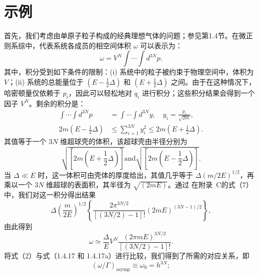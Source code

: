 \section{示例}\label{ux793aux4f8b_chap2}
首先，我们考虑由单原子粒子构成的经典理想气体的问题；参见第1.4节。在微正则系综中，代表系统各成员的相空间体积 \(\omega\) 可以表示为：
\begin{equation}\tag{2.3.9}\label{eq:2.3.9}
\omega = V^{N}\int\cdots\int d^{3N}p .
\end{equation}
其中，积分受到如下条件的限制：(i) 系统中的粒子被约束于物理空间中，体积为 \(V\)；(ii) 系统的总能量位于 \((E-\frac{1}{2}\Delta)\) 和 \((E+\frac{1}{2}\Delta)\) 之间。由于在这种情况下，哈密顿量仅依赖于 \(p_i\)，因此可以轻松地对 \(q_i\) 进行积分；这些积分结果会得到一个因子 \(V^N\)。剩余的积分是：
\begin{equation}\tag{2.3.10}\label{eq:2.3.10}
\begin{aligned}
\int\cdots\int d^{3N}p &= \int\cdots\int d^{3N}y, \quad y_i=\frac{p_i}{\sqrt{2m}}, \\
2m\left(E-\frac{1}{2}\Delta\right) &\le \sum_{i=1}^{3N}y_i^2 \le 2m\left(E+\frac{1}{2}\Delta\right).
\end{aligned}
\end{equation}
其值等于一个 \(3N\) 维超球壳的体积，该超球壳由半径分别为
\begin{equation}\tag{2.3.11}\label{eq:2.3.11}
\sqrt { \left[ 2 m \left( E + \frac { 1 } { 2 } \Delta \right) \right] }  \mathrm { a n d }  \sqrt { \left[ 2 m \left( E - \frac { 1 } { 2 } \Delta \right) \right] } .
\end{equation}
当 \(\Delta \ll E\) 时，这一体积可由壳体的厚度给出，其值几乎等于 \(\Delta(m/2E)^{1/2}\)，再乘以一个 \(3N\) 维超球的表面积，其半径为 \(\sqrt{(2mE)}\)。通过
在附录~C的式（7）中，我们对这一积分得出结果
\begin{equation}\tag{2.3.12}\label{eq:2.3.12}
\Delta \left( \frac { m } { 2 E } \right) ^{1 / 2} \left\{ \frac { 2 \pi ^{3 N / 2} } { [ ( 3 N / 2 ) - 1 ] ! } ( 2 m E ) ^{( 3 N - 1 ) / 2} \right\} ,
\end{equation}
由此得到
\begin{equation}\tag{2.3.13}\label{eq:2.3.13}
\omega \simeq \frac { \Delta } { E } V ^{N} \frac { ( 2 \pi m E ) ^{3 N / 2} } { [ ( 3 N / 2 ) - 1 ] ! } .
\end{equation}
将式（2）与式（1.4.17 和 1.4.17a）进行比较，我们得到了所需的对应关系，即
\begin{equation}\tag{2.3.14}\label{eq:2.3.14}
( \omega / \Gamma ) _ { \mathrm { a s y m p } } \equiv \omega _ { 0 } = h ^{3 N} ;
\end{equation}
